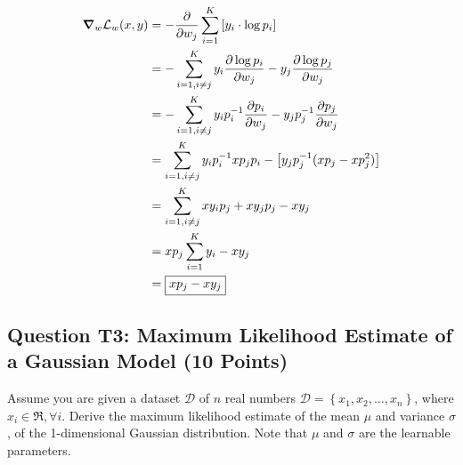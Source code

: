 \documentclass[10pt]{article}
\begin{document}
\begin{align*}
  \grad_{w}{\mathcal{L}_{w}(x,y)} &=-\pdv{}{w_j}\sum_{i=1}^{K} \left[y_{i} \cdot \log p_{i}\right]\\
  &=-\sum_{i=1, i\neq j}^{K} y_{i} \pdv{\log p_{i}}{w_j} - y_j \pdv{\log p_{j}}{w_j}\\
  &=-\sum_{i=1, i\neq j}^{K} y_{i} p_i^{-1} \pdv{p_{i}}{w_j} - y_j p_j^{-1} \pdv{p_{j}}{w_j} \\
  &=\sum_{i=1, i\neq j}^{K} y_{i} p_i^{-1} x p_j p_i - \left[y_j p_j^{-1} (x p_{j} - x p_j^2) \right]\\
  &=\sum_{i=1, i\neq j}^{K} x y_{i} p_j + x y_j p_{j} - x y_j \\
  &=x p_j \sum_{i=1}^{K} y_{i} - x y_j\\
  &= \boxed{x p_j - x y_j}
  \end{align*}

\pagebreak
\subsection*{Question T3: Maximum Likelihood Estimate of a Gaussian Model (10 Points)}
Assume you are given a dataset $\mathcal{D}$ of $n$ real numbers $\mathcal{D}=\left\{x_{1}, x_{2}, \ldots, x_{n}\right\}$, where $x_{i} \in \Re, \forall i$. Derive the maximum likelihood estimate of the mean $\mu$ and variance $\sigma$, of the 1-dimensional Gaussian distribution. Note that $\mu$ and $\sigma$ are the learnable parameters.
\end{document}
